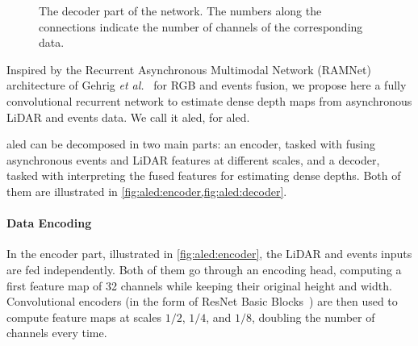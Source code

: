 \begin{figure}
{
  }
  \caption{The decoder part of the network. The numbers along the connections indicate the number of channels of the corresponding data.}\label{fig:aled:decoder}
\end{figure}

Inspired by the Recurrent Asynchronous Multimodal Network (RAMNet) architecture of Gehrig \textit{et al.}~\cite{Gehrig2021CombiningEA} for RGB and events fusion, we propose here a fully convolutional recurrent network to estimate dense depth maps from asynchronous LiDAR and events data. We call it \acrshort{aled}, for \acrlong{aled}.

\acrshort{aled} can be decomposed in two main parts: an encoder, tasked with fusing asynchronous events and LiDAR features at different scales, and a decoder, tasked with interpreting the fused features for estimating dense depths. Both of them are illustrated in \cref{fig:aled:encoder,fig:aled:decoder}.

\paragraph{Data Encoding}
In the encoder part, illustrated in \cref{fig:aled:encoder}, the LiDAR and events inputs are fed independently. Both of them go through an encoding head, computing a first feature map of 32 channels while keeping their original height and width. Convolutional encoders (in the form of ResNet Basic Blocks~\cite{He2016DeepRL}) are then used to compute feature maps at scales \(1/2\), \(1/4\), and \(1/8\), doubling the number of channels every time.

